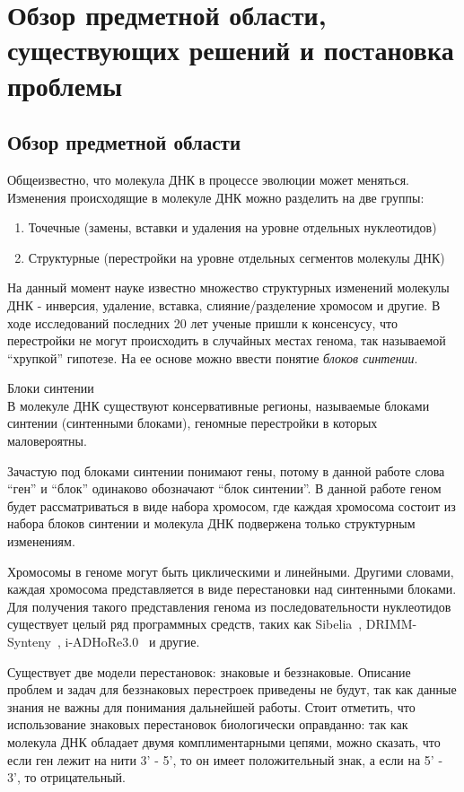 \chapter{Обзор предметной области, существующих решений и постановка проблемы}

\section{Обзор предметной области}
Общеизвестно, что молекула ДНК в процессе эволюции может меняться.
Изменения происходящие в молекуле ДНК можно разделить на две группы:
\begin{enumerate}
  \item Точечные (замены, вставки и удаления на уровне отдельных нуклеотидов)
  \item Структурные (перестройки на уровне отдельных сегментов молекулы ДНК)
\end{enumerate}
На данный момент науке известно множество структурных изменений молекулы ДНК - инверсия, удаление, вставка, слияние/разделение хромосом и другие.
В ходе исследований последних 20 лет ученые пришли к консенсусу, что перестройки не могут происходить в случайных местах генома,
так называемой ``хрупкой'' гипотезе.
На ее основе можно ввести понятие \textit{блоков синтении}.

\begin{define}{Блоки синтении} \\
  В молекуле ДНК существуют консервативные регионы, называемые блоками синтении (синтенными блоками),
  геномные перестройки в которых маловероятны.
\end{define}

Зачастую под блоками синтении понимают гены, потому в данной работе слова ``ген'' и ``блок'' одинаково обозначают ``блок синтении''.
В данной работе геном будет рассматриваться в виде набора хромосом,
где каждая хромосома состоит из набора блоков синтении и молекула ДНК подвержена только структурным изменениям.

Хромосомы в геноме могут быть циклическими и линейными.
Другими словами, каждая хромосома представляется в виде перестановки над синтенными блоками.
Для получения такого представления генома из последовательности нуклеотидов существует целый ряд программных средств,
таких как Sibelia~\cite{minkin2013sibelia}, DRIMM-Synteny~\cite{pham2010drimm}, i-ADHoRe3.0~\cite{proost2012adhore} и другие.

Существует две модели перестановок: знаковые и беззнаковые.
Описание проблем и задач для беззнаковых перестроек приведены не будут, так как данные знания не важны для понимания дальнейшей работы.
Стоит отметить, что использование знаковых перестановок биологически оправданно:
так как молекула ДНК обладает двумя комплиментарными цепями, можно сказать,
что если ген лежит на нити 3' - 5', то он имеет положительный знак, а если на 5' - 3', то отрицательный.

